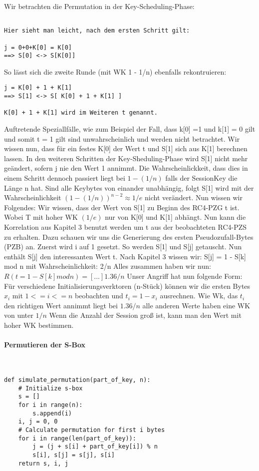 \documentclass[10pt,a4paper]{article}
\begin{document}
Wir betrachten die Permutation in der Key-Scheduling-Phase:

\begin{verbatim}

Hier sieht man leicht, nach dem ersten Schritt gilt:

j = 0+0+K[0] = K[0]  
==> S[0] <-> S[K[0]] 
\end{verbatim}
So lässt sich die zweite Runde (mit WK 1 - 1/n) ebenfalls rekontruieren:
\begin{verbatim}
j = K[0] + 1 + K[1]  
==> S[1] <-> S[ K[0] + 1 + K[1] ]  

K[0] + 1 + K[1] wird im Weiteren t genannt.
\end{verbatim}

Auftretende Speziallfälle, wie zum Beispiel der Fall, dass k[0] =1 und k[1] = 0 gilt und somit t = 1 gilt sind unwahrscheinlich und werden nicht betrachtet. Wir wissen nun, dass für ein festes K[0] der Wert t und S[1] sich aus K[1] berechnen lassen. In den weiteren Schritten der Key-Sheduling-Phase wird S[1] nicht mehr geändert, sofern j nie den Wert 1 annimmt. Die Wahrscheinlickkeit, dass dies in einem Schritt dennoch passiert liegt bei $1 - (1/n)$ falls der SessionKey die Länge n hat. Sind alle Keybytes von einander unabhängig, folgt S[1] wird mit der Wahrscheinlichkeit $(1-(1/n))^{n-2} \approx 1/e$ nicht verändert.
Nun wissen wir Folgendes: Wir wissen, dass der Wert von S[1] zu Beginn des RC4-PZG t ist. Wobei T mit hoher WK $(1/e)$ nur von K[0] und K[1] abhängt. Nun kann die Korrelation aus Kapitel 3 benutzt werden um t aus der beobachteten RC4-PZS zu erhalten. Dazu schauen wir uns die Generierung des ersten Pseudozufall-Bytes (PZB) an.
Zuerst wird i auf 1 gesetzt. So werden S[1] und S[j] getauscht. Nun enthält S[j] den interessanten Wert t. Nach Kapitel 3 wissen wir: S[j] = 1 - S[k] mod n mit Wahrscheinlichkeit: 2/n Alles zusammen haben wir nun: $R( t = 1 - S[k] mod n) = [...] 1.36 /n$
Unser Angriff hat nun folgende Form: Für verschiedene Initialisierungsverktoren (n-Stück) können wir die ersten Bytes $x_i$ mit $1 <= i <= n$ beobachten und $t_i = 1 - x_i$ ausrechnen. Wie Wk, das $t_i$ den richtigen Wert annimmt liegt bei $1.36/n$ alle anderen Werte haben eine WK von unter $1/n$ Wenn die Anzahl der Session groß ist, kann man den Wert mit hoher WK bestimmen.

\paragraph{Permutieren der S-Box}\ 
\begin{lstlisting}
def simulate_permutation(part_of_key, n):
    # Initialize s-box
    s = []
    for i in range(n):
        s.append(i)
    i, j = 0, 0
    # Calculate permutation for first i bytes
    for i in range(len(part_of_key)):
        j = (j + s[i] + part_of_key[i]) % n
        s[i], s[j] = s[j], s[i]
    return s, i, j
\end{lstlisting}
\end{document}
